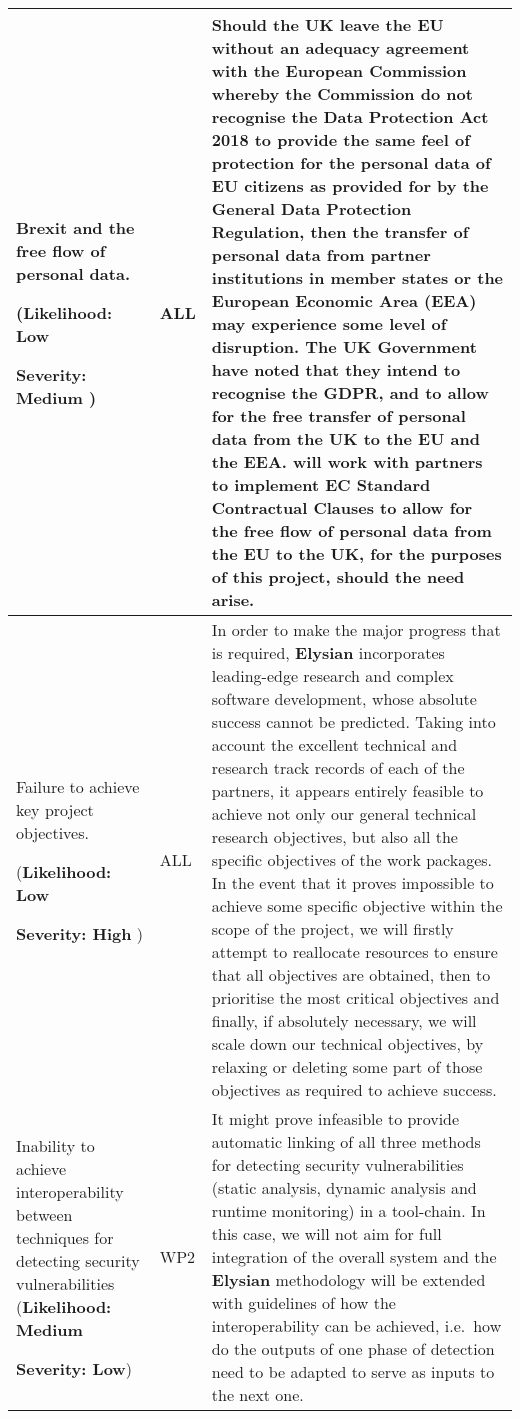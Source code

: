 \documentclass[a4paper,11pt]{article}
\newcommand{\project}[1]{\textbf{#1}\xspace}
\newcommand{\SECURITY}{\project{Elysian}}
\newcommand{\TheProject}{\SECURITY}
\begin{document}
\begin{longtable}{| p{3.5cm} | p{1.5cm} | p{11.8cm}  |}
\\\hline
Brexit and the free flow of personal data.
 \par
(\textbf{Likelihood: Low}
\par
\textbf{Severity: Medium}
)
& ALL & 

Should the UK leave the EU %
without an adequacy agreement with the European Commission whereby the Commission do not recognise the Data Protection Act 2018 to provide the same feel of protection for the personal data of EU citizens as provided for by the General Data Protection Regulation, then the transfer of personal data from partner institutions in member states or the European Economic Area (EEA) may experience some level of disruption.
The UK Government have noted that they intend to recognise the GDPR, and to allow for the free transfer of personal data from the UK to the EU and the EEA. \SAshort{} will work with partners to implement EC Standard Contractual Clauses to allow for the free flow of personal data from the EU to the UK, for the purposes of this project, should the need arise.

\\\hline
Failure to achieve key project objectives.
\par
(\textbf{Likelihood: Low}
\par
\textbf{Severity: High}
)
& ALL & 
In order to make the major progress that is required,
\TheProject{} incorporates leading-edge
research and complex software development, whose absolute success cannot be predicted. 
Taking into account the excellent technical and research track records of each of
the partners, it appears entirely feasible to achieve not only our general
technical research objectives, but also all the specific objectives
of the work packages.  In the event that it
proves impossible to achieve some specific objective within the
scope of the project, we will firstly attempt to reallocate
resources to ensure that all objectives are obtained, then
to prioritise the most critical objectives and finally, if absolutely necessary, we will scale down our technical objectives, by
relaxing or deleting some part of those objectives as required
to achieve success. 

\\\hline
Inability to achieve interoperability between techniques for detecting security vulnerabilities
(\textbf{Likelihood: Medium}
\par
{\textbf{Severity: Low}})
& WP2 &
It might prove infeasible to provide automatic linking of all three methods for detecting security vulnerabilities (static analysis, dynamic analysis and runtime monitoring) in a tool-chain. In this case, we will not aim for full integration of the overall system and the \TheProject{} methodology will be extended with guidelines of how the interoperability can be achieved, i.e.~how do the outputs of one phase of detection need to be adapted to serve as inputs to the next one. 


\end{longtable}
\end{document}
